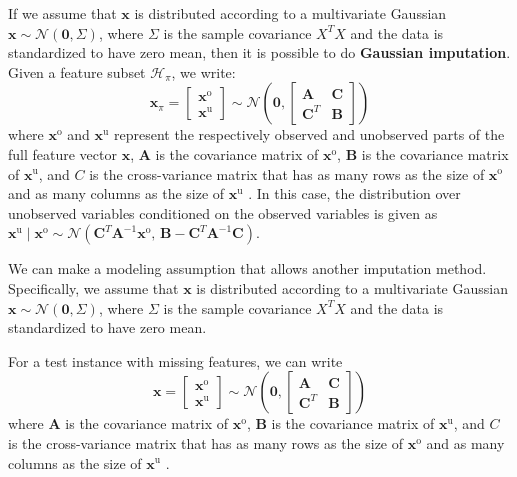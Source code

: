 If we assume that $\mathbf{x}$ is distributed according to a multivariate Gaussian $\mathbf{x} \sim \mathcal{N}(\mathbf{0}, \Sigma)$, where $\Sigma$ is the sample covariance $X^T X$ and the data is standardized to have zero mean, then it is possible to do \textbf{Gaussian imputation}.
Given a feature subset $\mathcal{H}_\pi$, we write:
\begin{equation}
\mathbf{x}_\pi = \begin{bmatrix} \mathbf{x}^\text{o}\\  \mathbf{x}^\text{u} \end{bmatrix} \sim \mathcal{N} \left( \mathbf{0}, \begin{bmatrix} \mathbf{A} & \mathbf{C}\\ \mathbf{C}^T & \mathbf{B} \end{bmatrix} \right)
\end{equation}
where $\mathbf{x}^\text{o}$ and $\mathbf{x}^\text{u}$ represent the respectively observed and unobserved parts of the full feature vector $\mathbf{x}$, $\mathbf{A}$ is the covariance matrix of $\mathbf{x}^\text{o}$, $\mathbf{B}$ is the covariance matrix of $\mathbf{x}^\text{u}$, and $C$ is the cross-variance matrix that has as many rows as the size of $\mathbf{x}^\text{o}$ and as many columns as the size of $\mathbf{x}^\text{u}$ \parencite{Roweis-gaussian-identities}.
In this case, the distribution over unobserved variables conditioned on the observed variables is given as
$\mathbf{x}^\text{u} \mid \mathbf{x}^\text{o} \sim \mathcal{N} \left( \mathbf{C}^T \mathbf{A}^{-1} \mathbf{x}^\text{o},\, \mathbf{B} - \mathbf{C}^T \mathbf{A}^{-1} \mathbf{C} \right)$.

We can make a modeling assumption that allows another imputation method.
Specifically, we assume that $\mathbf{x}$ is distributed according to a multivariate Gaussian $\mathbf{x} \sim \mathcal{N}(\mathbf{0}, \Sigma)$, where $\Sigma$ is the sample covariance $X^T X$ and the data is standardized to have zero mean.

For a test instance with missing features, we can write
\begin{equation}
\mathbf{x} = \begin{bmatrix} \mathbf{x}^\text{o}\\  \mathbf{x}^\text{u} \end{bmatrix} \sim \mathcal{N} \left( \mathbf{0}, \begin{bmatrix} \mathbf{A} & \mathbf{C}\\ \mathbf{C}^T & \mathbf{B} \end{bmatrix} \right)
\end{equation}
where $\mathbf{A}$ is the covariance matrix of $\mathbf{x}^\text{o}$, $\mathbf{B}$ is the covariance matrix of $\mathbf{x}^\text{u}$, and $C$ is the cross-variance matrix that has as many rows as the size of $\mathbf{x}^\text{o}$ and as many columns as the size of $\mathbf{x}^\text{u}$ \cite{Roweis-gaussian-identities}.

